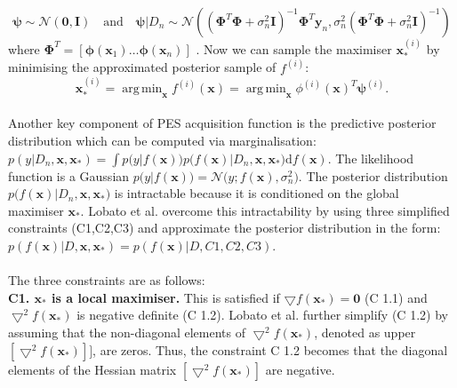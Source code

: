 \documentclass[a4paper,11pt]{report}
\DeclareMathOperator*{\argmin}{arg\,min}
\begin{document}
	 \[ \boldsymbol{\psi} \sim \mathcal{N} ( \mathbf{0}, \mathbf{I})  \hspace{12pt} \text{and}  \hspace{12pt}  \boldsymbol{\psi} \vert D_n \sim \mathcal{N} \left( (\boldsymbol{\Phi}^T \boldsymbol{\Phi} + \sigma_n^2 \mathbf{I})^{-1} \boldsymbol{\Phi}^T \mathbf{y}_n,   \sigma_n^2 (\boldsymbol{\Phi}^T \boldsymbol{\Phi} + \sigma_n^2 \mathbf{I})^{-1} \right) \]	
where $\boldsymbol{\Phi}^T = [ \boldsymbol{\phi} (\mathbf{x}_1) \dots \boldsymbol{\phi} (\mathbf{x}_n) ] $ \cite{hernandez2014predictive}. Now we can sample the maximiser $\mathbf{x}_{*}^{(i)}$ by minimising the approximated posterior sample of $f^{(i)}$: 
\begin{equation}
\mathbf{x}_{*}^{(i)}= \argmin_\mathbf{x} f ^{(i)}(\mathbf{x}) =  \argmin_\mathbf{x} \phi^{(i)} (\mathbf{x}) ^{T} \boldsymbol{\psi} ^{(i)}.
\end{equation}
\\
Another key component of PES acquisition function is the  predictive posterior distribution which can be computed via marginalisation: $p(y \vert D_n,\mathbf{x},\mathbf{x}_{*}) = \int p \big(y \vert f(\mathbf{x}) \big) p \big( f(\mathbf{x}) \vert D_n, \mathbf{x}, \mathbf{x}_{*} \big) \mathrm{d} f(\mathbf{x})$. The likelihood function is a Gaussian $ p\big(y \vert f(\mathbf{x}) \big) = \mathcal{N} \big(y ; f(\mathbf{x}), \sigma_n^2 \big) $. The posterior distribution $p \big( f(\mathbf{x}) \vert D_n, \mathbf{x}, \mathbf{x}_{*} \big) $ is intractable because it is conditioned on the global maximiser $\mathbf{x}_{*}$.  Lobato et al.\cite{hernandez2014predictive} overcome this intractability by using three simplified constraints (C1,C2,C3) and approximate the posterior distribution in the form: $p ( f(\mathbf{x}) \vert D, \mathbf{x}, \mathbf{x}_{*}) = p ( f(\mathbf{x}) \vert D, C1,C2,C3) $. 
\\\\
The three constraints are as follows:
\\
\textbf{C1. $\mathbf{x}_{*}$ is a local maximiser.} This is satisfied if $\bigtriangledown f(\mathbf{x}_{*}) = \mathbf{0}$ (C 1.1) and $\bigtriangledown^2 f(\mathbf{x}_{*}) $ is negative definite (C 1.2).  Lobato et al.\cite{hernandez2014predictive} further simplify (C 1.2) by assuming that the non-diagonal elements of $\bigtriangledown^2 f(\mathbf{x}_{*}) $, denoted as  upper $[\bigtriangledown^2 f(\mathbf{x}_{*}) ]] $, are zeros. Thus, the constraint C 1.2 becomes that the diagonal elements of the Hessian matrix $[\bigtriangledown^2 f(\mathbf{x}_{*})]$ are negative. 
\end{document}
